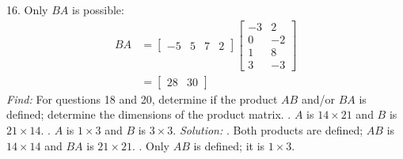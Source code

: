 \documentclass[11pt]{homework}
\begin{document}
16. Only $BA$ is possible:
\begin{align*}
BA &=
  \begin{bmatrix}
    -5 & 5 & 7 & 2
  \end{bmatrix}
  \begin{bmatrix}
    -3 & 2 \\
    0 & -2 \\
    1 & 8 \\
    3 & -3 
  \end{bmatrix}\\
& = 
  \begin{bmatrix}
    28 & 30
  \end{bmatrix}
\end{align*}
\newline
\emph{Find:}
\newline
For questions 18 and 20, determine if the product $AB$ and/or $BA$ is defined;
determine the dimensions of the product matrix.
. $A$ is $14 \times 21$ and $B$ is $ 21 \times 14$.
. $A$ is $1 \times 3$ and $B$ is $3\times 3$.
\newline
\newline
\emph{Solution:}
. Both products are defined; $AB$ is $ 14 \times 14$ 
and $BA$ is $21 \times 21$.
. Only $AB$ is defined; it is $1 \times 3$.
\end{document}
